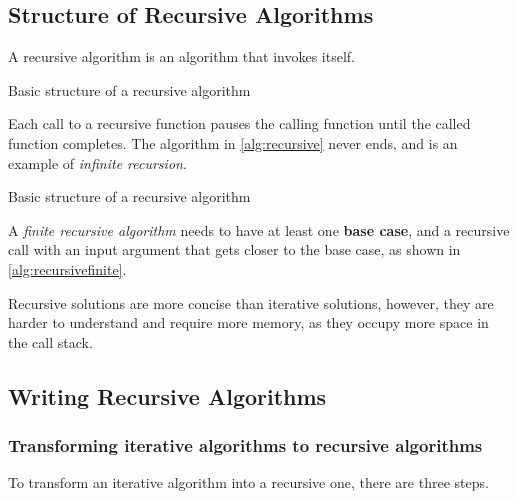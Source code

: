 \subsection{Structure of Recursive Algorithms}

A recursive algorithm is an algorithm that invokes itself.

\begin{algorithm}[H]
    \caption{Basic structure of a recursive algorithm}
    \label{alg:recursive}
    \begin{algorithmic}
        \EndFunction{}
    \end{algorithmic}
\end{algorithm}

Each call to a recursive function pauses the calling function until the called function completes. The algorithm in \autoref{alg:recursive} never ends, and is an example of \textit{infinite recursion}.

\begin{algorithm}[H]
    \caption{Basic structure of a recursive algorithm}
    \label{alg:recursivefinite}
    \begin{algorithmic}
        \EndIf{}
        \EndFunction{}
    \end{algorithmic}
\end{algorithm}

A \textit{finite recursive algorithm} needs to have at least one \textbf{base case}, and a recursive call with an input argument that gets closer to the base case, as shown in \autoref{alg:recursivefinite}.

Recursive solutions are more concise than iterative solutions, however, they are harder to understand and require more memory, as they occupy more space in the call stack.


\subsection{Writing Recursive Algorithms}

\subsubsection{Transforming iterative algorithms to recursive algorithms}

To transform an iterative algorithm into a recursive one, there are three steps.

